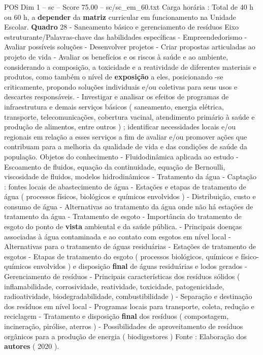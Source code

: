 \begin{textsample}{POS Dim 1 – sc – Score 75.00 – sc/sc\_em\_60.txt}
Carga horária : Total de 40 h ou 60 h, a \textbf{depender} da \textbf{matriz} curricular em funcionamento na Unidade Escolar. \textbf{Quadro} 28 - Saneamento básico e gerenciamento de resíduos Eixo estruturante/Palavras-chave das habilidades específicas - Empreendedorismo - Avaliar possíveis soluções - Desenvolver projetos - Criar propostas articuladas ao projeto de vida - Avaliar os benefícios e os riscos à saúde e ao ambiente, considerando a composição, a toxicidade e a reatividade de diferentes materiais e produtos, como também o nível de \textbf{exposição} a eles, posicionando -se criticamente, propondo soluções individuais e/ou coletivas para seus usos e descartes responsáveis. - Investigar e analisar os efeitos de programas de infraestrutura e demais serviços básicos ( saneamento, energia elétrica, transporte, telecomunicações, cobertura vacinal, atendimento primário à saúde e produção de alimentos, entre outros ) ; identificar necessidades locais e/ou regionais em relação a esses serviços a fim de avaliar e/ou promover ações que contribuam para a melhoria da qualidade de vida e das condições de saúde da população.
Objetos do conhecimento - Fluidodinâmica aplicada ao estudo - Escoamento de fluidos, equação da continuidade, equação de Bernoulli, viscosidade de fluidos, modelos hidrodinâmicos - Tratamento da água - Captação : fontes locais de abastecimento de água - Estações e etapas de tratamento de água ( processos físicos, biológicos e químicos envolvidos ) - Distribuição, custo e consumo de água - Alternativas ao tratamento da água onde não há estações de tratamento da água - Tratamento de esgoto - Importância do tratamento de esgoto do ponto de \textbf{vista} ambiental e da saúde pública. - Principais doenças associadas à água contaminada e ao contato com esgotos em nível local - Alternativas para o tratamento de águas residuárias - Estações de tratamento de esgotos - Etapas de tratamento do esgoto ( processos biológicos, químicos e físico-químicos envolvidos ) e disposição \textbf{final} de águas residuárias e lodos gerados - Gerenciamento de resíduos - Principais características dos resíduos sólidos ( inflamabilidade, corrosividade, reatividade, toxicidade, patogenicidade, radioatividade, biodegradabilidade, combustibilidade ) - Separação e destinação dos resíduos em nível local - Programas locais para transporte, coleta, redução e reciclagem - Tratamento e disposição \textbf{final} dos resíduos ( compostagem, incineração, pirólise, aterros ) - Possibilidades de aproveitamento de resíduos orgânicos para a produção de energia ( biodigestores ) Fonte : Elaboração dos \textbf{autores} ( 2020 ).

\end{textsample}
